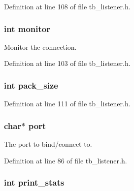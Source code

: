 Definition at line 108 of file tb\-\_\-listener.\-h.

\hypertarget{structtb__test__params__t_a46fa1969de5714507943035793d36269}{
\subsubsection[{monitor}]{\setlength{\rightskip}{0pt plus 5cm}int monitor}}\label{structtb__test__params__t_a46fa1969de5714507943035793d36269}


Monitor the connection. 



Definition at line 103 of file tb\-\_\-listener.\-h.

\hypertarget{structtb__test__params__t_af7112fe07fe05134febc994e10196ce5}{
\subsubsection[{pack\-\_\-size}]{\setlength{\rightskip}{0pt plus 5cm}int pack\-\_\-size}}\label{structtb__test__params__t_af7112fe07fe05134febc994e10196ce5}


Definition at line 111 of file tb\-\_\-listener.\-h.

\hypertarget{structtb__test__params__t_add99ba4ea70b8f66170823cad9a55fa4}{
\subsubsection[{port}]{\setlength{\rightskip}{0pt plus 5cm}char$\ast$ port}}\label{structtb__test__params__t_add99ba4ea70b8f66170823cad9a55fa4}


The port to bind/connect to. 



Definition at line 86 of file tb\-\_\-listener.\-h.

\hypertarget{structtb__test__params__t_a21a0be842e8fa2c780fa87f45bd5d17e}{
\subsubsection[{print\-\_\-stats}]{\setlength{\rightskip}{0pt plus 5cm}int print\-\_\-stats}}\label{structtb__test__params__t_a21a0be842e8fa2c780fa87f45bd5d17e}


